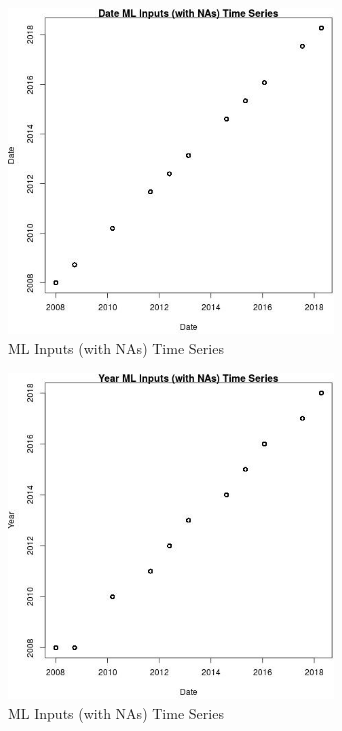 \begin{figure} 
\centering  
\includegraphics[width=0.77\textwidth]{Code_Outputs/Report_ML_input_PM25_Step4_part_e_de_duplicated_aves_compiled_2019-05-18wNAs_DatevDate.jpg} 
\caption{\label{fig:Report_ML_input_PM25_Step4_part_e_de_duplicated_aves_compiled_2019-05-18wNAsDatevDate}ML Inputs (with NAs) Time Series} 
\end{figure} 
 

\begin{figure} 
\centering  
\includegraphics[width=0.77\textwidth]{Code_Outputs/Report_ML_input_PM25_Step4_part_e_de_duplicated_aves_compiled_2019-05-18wNAs_YearvDate.jpg} 
\caption{\label{fig:Report_ML_input_PM25_Step4_part_e_de_duplicated_aves_compiled_2019-05-18wNAsYearvDate}ML Inputs (with NAs) Time Series} 
\end{figure} 
 

